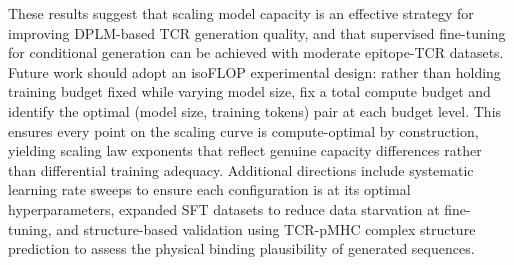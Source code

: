 \documentclass[12pt]{article}
\begin{document}
These results suggest that scaling model capacity is an effective strategy for improving
DPLM-based TCR generation quality, and that supervised fine-tuning for conditional generation
can be achieved with moderate epitope-TCR datasets. Future work should adopt an isoFLOP experimental design: rather than holding training budget
fixed while varying model size, fix a total compute budget and identify the optimal
(model size, training tokens) pair at each budget level. This ensures every point on the
scaling curve is compute-optimal by construction, yielding scaling law exponents that reflect
genuine capacity differences rather than differential training adequacy. Additional directions
include systematic learning rate sweeps to ensure each configuration is at its optimal
hyperparameters, expanded SFT datasets to reduce data starvation at fine-tuning, and
structure-based validation using TCR-pMHC complex structure prediction to assess the physical
binding plausibility of generated sequences.

\newpage


\end{document}
